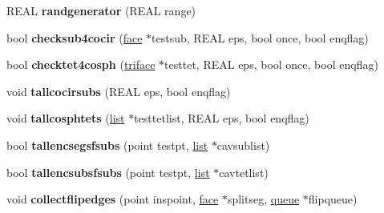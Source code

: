 \begin{DoxyCompactItemize}
R\+E\+AL {\bfseries randgenerator} (R\+E\+AL range)
\item 
\mbox{\label{classStemMesh3D_1_1tetgenmesh_aabba122f97f28e9b03feac0a9c97b665}} 
bool {\bfseries checksub4cocir} (\hyperlink{classStemMesh3D_1_1tetgenmesh_1_1face}{face} $\ast$testsub, R\+E\+AL eps, bool once, bool enqflag)
\item 
\mbox{\label{classStemMesh3D_1_1tetgenmesh_a1bc6d9a751de93fabbe9dd83a9e3c7ef}} 
bool {\bfseries checktet4cosph} (\hyperlink{classStemMesh3D_1_1tetgenmesh_1_1triface}{triface} $\ast$testtet, R\+E\+AL eps, bool once, bool enqflag)
\item 
\mbox{\label{classStemMesh3D_1_1tetgenmesh_ac2e6b655710b2fb437e5f387eefdf871}} 
void {\bfseries tallcocirsubs} (R\+E\+AL eps, bool enqflag)
\item 
\mbox{\label{classStemMesh3D_1_1tetgenmesh_a52e8ab0923faceef38fdc379745fb39d}} 
void {\bfseries tallcosphtets} (\hyperlink{classStemMesh3D_1_1tetgenmesh_1_1list}{list} $\ast$testtetlist, R\+E\+AL eps, bool enqflag)
\item 
\mbox{\label{classStemMesh3D_1_1tetgenmesh_a23fe540bc11a2176e8457f3b4d727ebb}} 
bool {\bfseries tallencsegsfsubs} (point testpt, \hyperlink{classStemMesh3D_1_1tetgenmesh_1_1list}{list} $\ast$cavsublist)
\item 
\mbox{\label{classStemMesh3D_1_1tetgenmesh_a10b2f49fafd2c20b714fcc4e8b048180}} 
bool {\bfseries tallencsubsfsubs} (point testpt, \hyperlink{classStemMesh3D_1_1tetgenmesh_1_1list}{list} $\ast$cavtetlist)
\item 
\mbox{\label{classStemMesh3D_1_1tetgenmesh_a6f348d311e679597333dc617aebd64b2}} 
void {\bfseries collectflipedges} (point inspoint, \hyperlink{classStemMesh3D_1_1tetgenmesh_1_1face}{face} $\ast$splitseg, \hyperlink{classStemMesh3D_1_1tetgenmesh_1_1queue}{queue} $\ast$flipqueue)
\item 
\mbox{\label{classStemMesh3D_1_1tetgenmesh_a54f7f533d8befea35d288099e616bbbe}} 

\end{DoxyCompactItemize}
